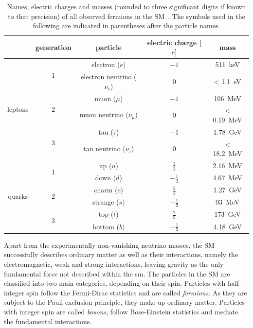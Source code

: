 \begin{table}
	\centering
	\setlength\heavyrulewidth{0.2ex}
	\small
	\caption{Names, electric charges and masses (rounded to three significant digits if known to that precision) of all observed fermions in the SM~\cite{pdg2020}. The symbols used in the following are indicated in parentheses after the particle names.}
	\begin{tabular} {c c c c c}
		
		\toprule
				& generation & particle & electric charge [$e$] & mass \\ 
		\midrule 
				\multirow{6}{*}{leptons}& \multirow{2}{*}{1} & electron ($e$)& $-1$ & \SI{511}{\keV}\\
				& & electron neutrino ($\nu_e$) & 0 & < \SI{1.1}{\eV} \\
				& \multirow{2}{*}{2} & muon ($\mu$)& $-1$ & \SI{106}{\MeV}\\
				& & muon neutrino ($\nu_\mu$) & 0 & < \SI{0.19}{\MeV} \\
				& \multirow{2}{*}{3} & tau ($\tau$)& $-1$ & \SI{1.78}{\GeV}\\
				& & tau neutrino ($\nu_\tau$) & 0 & < \SI{18.2}{\MeV} \\
		\midrule 
				\multirow{6}{*}{quarks}& \multirow{2}{*}{1} & up ($u$)& $\frac{2}{3}$ & \SI{2.16}{\MeV}\\
				& & down ($d$) & $-\frac{1}{3}$ & \SI{4.67}{\MeV} \\
				& \multirow{2}{*}{2} & charm ($c$)& $\frac{2}{3}$ & \SI{1.27}{\GeV}\\
				& & strange ($s$) & $-\frac{1}{3}$ &\SI{93}{\MeV} \\
				& \multirow{2}{*}{3} & top ($t$)& $\frac{2}{3}$ & \SI{173}{\GeV}\\
				& & bottom ($b$) & $-\frac{1}{3}$ & \SI{4.18}{\GeV} \\
		\bottomrule
	\end{tabular}\vspace{2mm}
	\label{tab:particles_fermions}   
\end{table}

Apart from the experimentally non-vanishing neutrino masses, the SM successfully describes ordinary matter as well as their interactions, namely the electromagnetic, weak and strong interactions, leaving gravity as the only fundamental force not described within the \gls{sm}.
The particles in the SM are classified into two main categories, depending on their spin.
Particles with half-integer spin follow the Fermi-Dirac statistics and are called \textit{fermions}. As they are subject to the Pauli exclusion principle, they make up ordinary matter.
Particles with integer spin are called \textit{bosons}, follow Bose-Einstein statistics and mediate the fundamental interactions. 

